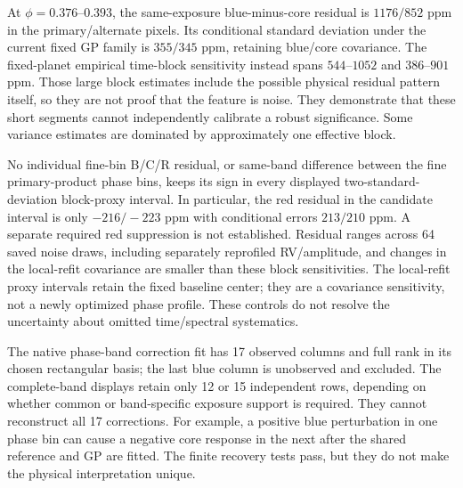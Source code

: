 At $\phi=0.376$--$0.393$, the same-exposure blue-minus-core residual is
$1176/852$ ppm in the primary/alternate pixels. Its conditional standard
deviation under the current fixed GP family is $355/345$ ppm, retaining
blue/core covariance. The fixed-planet empirical time-block sensitivity
instead spans $544$--$1052$ and $386$--$901$ ppm. Those large block estimates
include the possible physical residual pattern itself, so they are not proof
that the feature is noise. They demonstrate that these short segments cannot
independently calibrate a robust significance. Some variance estimates are
dominated by approximately one effective block.

No individual fine-bin B/C/R residual, or same-band difference between the
fine primary-product phase bins, keeps its sign in every displayed
two-standard-deviation block-proxy interval. In particular, the red residual
in the candidate interval is only $-216/-223$ ppm with conditional errors
$213/210$ ppm. A separate required red suppression is not established.
Residual ranges across 64 saved noise draws, including separately reprofiled
RV/amplitude, and changes in the local-refit covariance are smaller than these
block sensitivities. The local-refit proxy intervals retain the fixed baseline
center; they are a covariance sensitivity, not a newly optimized phase profile.
These controls do not resolve the uncertainty about omitted time/spectral
systematics.

The native phase-band correction fit has 17 observed columns and full rank
in its chosen rectangular basis; the last blue column is unobserved and
excluded. The complete-band displays retain only 12 or 15 independent rows,
depending on whether common or band-specific exposure support is required.
They cannot reconstruct all 17 corrections. For example, a positive blue
perturbation in one phase bin can cause a negative core response in the next
after the shared reference and GP are fitted. The finite recovery tests pass,
but they do not make the physical interpretation unique.
